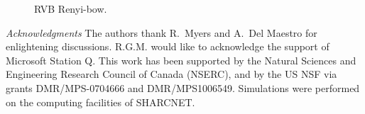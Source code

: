 \documentclass[prl,aps,twocolumn,floatfix,amsmath,amssymb,superscriptaddress,tightenlines]{revtex4}
\begin{document}
 \begin{figure}[ht]
   \begin{center}
   \end{center}
   \caption{RVB Renyi-bow. }
   \label{fig:2}
 \end{figure}

{\it Acknowledgments} 
The authors thank R.~Myers and A.~Del Maestro for enlightening discussions. 
R.G.M. would like to acknowledge the support of Microsoft Station Q.
This work has been supported by the Natural Sciences and Engineering
Research Council of Canada (NSERC), and by the US NSF via grants DMR/MPS-0704666 and DMR/MPS1006549.  Simulations were performed on the computing facilities of SHARCNET.



\end{document}
